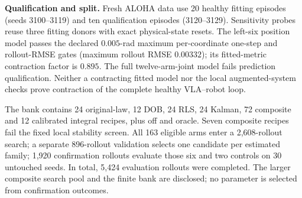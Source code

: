 \documentclass{article}
\begin{document}
\textbf{Qualification and split.} Fresh ALOHA data use 20 healthy fitting episodes
(seeds 3100--3119) and ten qualification episodes (3120--3129). Sensitivity probes reuse
three fitting donors with exact physical-state resets. The left-six position model passes
the declared $0.005$-rad maximum per-coordinate one-step and rollout-RMSE gates
(maximum rollout RMSE $0.00332$); its fitted-metric
contraction factor is $0.895$. The full twelve-arm-joint model fails prediction qualification.
Neither a contracting fitted model nor the local augmented-system checks prove contraction
of the complete healthy VLA--robot loop.

The bank contains 24 original-law, 12 DOB, 24 RLS, 24 Kalman, 72 composite and 12 calibrated
integral recipes, plus off and oracle. Seven composite recipes fail the fixed local
stability screen. All 163 eligible arms enter a 2,608-rollout search; a separate
896-rollout validation selects one candidate per estimated family; 1,920 confirmation
rollouts evaluate those six and two controls on 30 untouched seeds. In total, 5,424
evaluation rollouts were completed. The larger composite search pool and the finite bank
are disclosed; no parameter is selected from confirmation outcomes.
\end{document}
